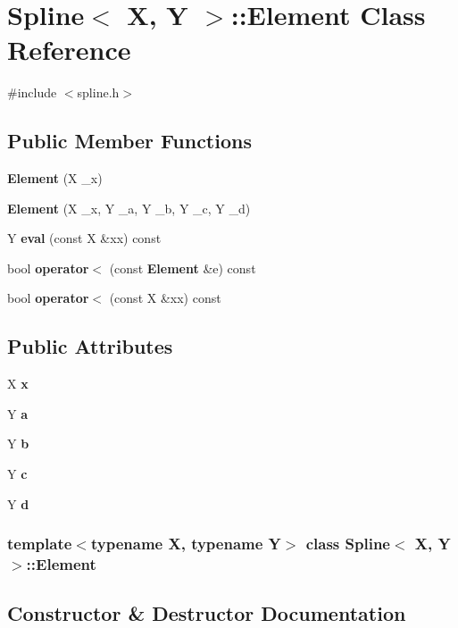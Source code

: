 \section{\-Spline$<$ \-X, \-Y $>$\-:\-:\-Element \-Class \-Reference}
\label{classSpline_1_1Element}


{\ttfamily \#include $<$spline.\-h$>$}

\subsection*{\-Public \-Member \-Functions}
\begin{DoxyCompactItemize}
\item 
{\bf \-Element} (\-X \-\_\-x)
\item 
{\bf \-Element} (\-X \-\_\-x, \-Y \-\_\-a, \-Y \-\_\-b, \-Y \-\_\-c, \-Y \-\_\-d)
\item 
\-Y {\bf eval} (const \-X \&xx) const 
\item 
bool {\bf operator$<$} (const {\bf \-Element} \&e) const 
\item 
bool {\bf operator$<$} (const \-X \&xx) const 
\end{DoxyCompactItemize}
\subsection*{\-Public \-Attributes}
\begin{DoxyCompactItemize}
\item 
\-X {\bf x}
\item 
\-Y {\bf a}
\item 
\-Y {\bf b}
\item 
\-Y {\bf c}
\item 
\-Y {\bf d}
\end{DoxyCompactItemize}
\subsubsection*{template$<$typename \-X, typename \-Y$>$ class Spline$<$ X, Y $>$\-::\-Element}



\subsection{\-Constructor \& \-Destructor \-Documentation}
